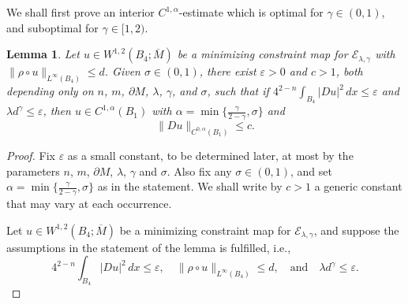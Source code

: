 \documentclass[11pt]{amsart}
\newcommand{\cE}{{\mathcal E}}
\newcommand{\e}{\varepsilon}
\theoremstyle{plain}
\newtheorem{lem}[thm]{Lemma}
\theoremstyle{definition}
\theoremstyle{remark}
\numberwithin{equation}{section}
\begin{document}
We shall first prove an interior $C^{1,\alpha}$-estimate which is optimal for $\gamma \in (0,1)$, and suboptimal for $\gamma \in[1,2)$. 

\begin{lem}
    \label{lem:C1a-sub}
    Let $u\in W^{1,2}(B_4;\overline M)$ be a minimizing constraint map for $\cE_{\lambda,\gamma}$ with $\|\rho\circ u\|_{L^\infty(B_4)} \leq d$. Given $\sigma\in(0,1)$, there exist $\e > 0$ and $c>1$, both depending only on $n$, $m$, $\partial M$, $\lambda$,  $\gamma$, and $\sigma$, such that if $4^{2-n}\int_{B_4}|Du|^2\,dx \leq \e$ and ${\lambda} d^\gamma \leq \e$, then $u\in C^{1,\alpha}(B_1)$ with $\alpha = \min\{\frac{\gamma}{2-\gamma},\sigma\}$ and  
    $$
    \| Du \|_{C^{0,\alpha}(B_1)} \leq c.
    $$
\end{lem}

\begin{proof}
Fix ${\e}$ as a small constant, to be determined later, at most by the parameters $n$, $m$, $\partial M$, $\lambda$, $\gamma$ and $\sigma$. Also fix any $\sigma\in(0,1)$, and set $\alpha = \min\{\frac{\gamma}{2-\gamma},\sigma\}$ as in the statement. We shall write by $c > 1$ a generic constant that may vary at each occurrence. 


Let $u\in W^{1,2}(B_4;\overline M)$ be a minimizing constraint map for $\cE_{\lambda,\gamma}$, and suppose the assumptions in the statement of the lemma is fulfilled, i.e., 
\begin{equation}
    \label{eq:Du-L2-e0}
    4^{2-n}\int_{B_4} |Du|^2\,dx \leq {\e}, \quad \|\rho\circ u\|_{L^\infty(B_4)}\leq d,\quad\text{and}\quad {\lambda} d^\gamma\leq {\e}.  
\end{equation} 


\end{proof}
\end{document}
